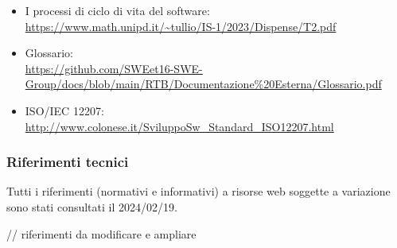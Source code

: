         \begin{itemize}
            \item I processi di ciclo di vita del software: \\
            \url{https://www.math.unipd.it/~tullio/IS-1/2023/Dispense/T2.pdf}
            \item Glossario: \\
            \url{https://github.com/SWEet16-SWE-Group/docs/blob/main/RTB/Documentazione%20Esterna/Glossario.pdf}
            \item ISO/IEC 12207: \\
            \url{http://www.colonese.it/SviluppoSw_Standard_ISO12207.html}
        \end{itemize}

        \subsubsection{Riferimenti tecnici}

        Tutti i riferimenti (normativi e informativi) a risorse web soggette a variazione sono stati consultati il 2024/02/19.


        // riferimenti da modificare e ampliare